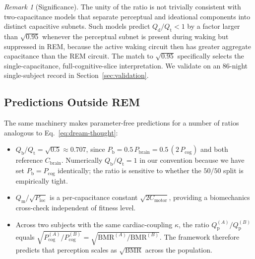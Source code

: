 \documentclass[11pt,twocolumn,a4paper]{article}
\theoremstyle{definition}
\theoremstyle{remark}
\newtheorem{remark}[theorem]{Remark}
\newcommand{\Qb}{Q_{\mathrm{b}}}
\newcommand{\Qm}{Q_{\mathrm{m}}}
\newcommand{\Qp}{Q_{\mathrm{p}}}
\newcommand{\Qt}{Q_{\mathrm{t}}}
\newcommand{\Qd}{Q_{\mathrm{d}}}
\newcommand{\Pb}{P_{\mathrm{b}}}
\newcommand{\Pbrain}{P_{\mathrm{brain}}}
\newcommand{\Pcog}{P_{\mathrm{cog}}}
\newcommand{\Cbrain}{C_{\mathrm{brain}}}
\newcommand{\Cmotor}{C_{\mathrm{motor}}}
\begin{document}
\begin{remark}[Significance]
The unity of the ratio is not trivially consistent with two-capacitance
models that separate perceptual and ideational components into
distinct capacitive subnets. Such models predict $\Qd/\Qt < 1$ by a
factor larger than $\sqrt{0.95}$ whenever the perceptual subnet is
present during waking but suppressed in REM, because the active
waking circuit then has greater aggregate capacitance than the REM
circuit. The match to $\sqrt{0.95}$ specifically selects the
single-capacitance, full-cognitive-slice interpretation. We validate
on an 86-night single-subject record in
Section~\ref{sec:validation}.
\end{remark}

\subsection{Predictions Outside REM}

The same machinery makes parameter-free predictions for a number of
ratios analogous to Eq.~\eqref{eq:dream-thought}:
\begin{itemize}[leftmargin=*]
\item $\Qb/\Qt = \sqrt{0.5} \approx 0.707$, since $\Pb = 0.5\,\Pbrain
= 0.5\,(2\,\Pcog)$ and both reference $\Cbrain$. Numerically
$\Qb/\Qt = 1$ in our convention because we have set $\Pb = \Pcog$
identically; the ratio is sensitive to whether the $50/50$ split is
empirically tight.
\item $\Qm/\sqrt{P_{\mathrm{loc}}}$ is a per-capacitance constant
$\sqrt{2\Cmotor}$, providing a biomechanics cross-check independent
of fitness level.
\item Across two subjects with the same cardiac-coupling $\kappa$, the
ratio $\Qp^{(A)}/\Qp^{(B)}$ equals $\sqrt{\Pcog^{(A)}/\Pcog^{(B)}}
= \sqrt{\mathrm{BMR}^{(A)}/\mathrm{BMR}^{(B)}}$. The framework
therefore predicts that perception scales as $\sqrt{\mathrm{BMR}}$
across the population.
\end{itemize}
\end{document}
